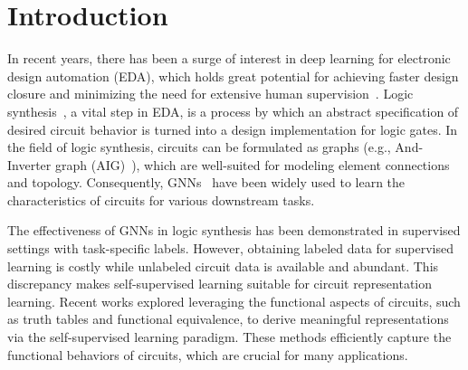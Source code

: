 \section{Introduction}

In recent years, there has been a surge of interest in deep learning for electronic design automation (EDA), which holds great potential for achieving faster design closure and minimizing the need for extensive human supervision~\citep{wen2022layoutransformer,chen2022pros,liang2023bufformer,chen2023reinforcement,wu2024chateda}.
Logic synthesis~\citep{hachtel2005logicsynth}, a vital step in EDA, is a process by which an abstract specification of desired circuit behavior is turned into a design implementation for logic gates.
In the field of logic synthesis, circuits can be formulated as graphs (e.g., And-Inverter graph (AIG)~\citep{mishchenko2006dag}), which are well-suited for modeling element connections and topology.
Consequently, GNNs~\citep{zhang2020grannite, zheng2024lstp, chowdhury2022bulls} have been widely used to learn the characteristics of circuits for various downstream tasks. 

The effectiveness of GNNs in logic synthesis has been demonstrated in supervised settings with task-specific labels.
However, obtaining labeled data for supervised learning is costly while unlabeled circuit data is available and abundant.
This discrepancy makes self-supervised learning suitable for circuit representation learning. 
Recent works \citep{wang2022functionality, shi2023deepgate2} explored leveraging the functional aspects of circuits, such as truth tables and functional equivalence, to derive meaningful representations via the self-supervised learning paradigm.
These methods efficiently capture the functional behaviors of circuits, which are crucial for many applications. 

